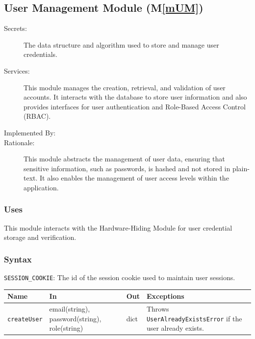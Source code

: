 \documentclass[12pt, titlepage]{article}
\newcommand{\mref}[1]{M\ref{#1}}
\begin{document}
\begin{description}
\begin{description}
\subsection{User Management Module (\mref{mUM})}
\begin{description}
  \item[Secrets:] The data structure and algorithm used to store and manage user
  credentials.
  \item[Services:]This module manages the creation, retrieval, and validation of
  user accounts. It interacts with the database to store user information and
  also provides interfaces for user authentication and Role-Based Access
  Control (RBAC).
  \item[Implemented By:] \progname{}
  \item[Rationale:] This module abstracts the management of user data, ensuring
  that sensitive information, such as passwords, is hashed and not stored in
  plain-text. It also enables the management of user access levels within the
  application. 
\end{description}

\subsubsection{Uses}
This module interacts with the Hardware-Hiding Module for user credential
storage and verification.

\subsubsection{Syntax}
\begin{description}
  \item[Exported Constants and Access Programs:]
  \item 
  \texttt{SESSION\_COOKIE}: The id of the session cookie used to maintain user sessions.
  
  \begin{table}[H]
    \centering
    \begin{tabular}{p{} p{} p{}
    p{}}
    \toprule
    \textbf{Name} & \textbf{In} & \textbf{Out} & \textbf{Exceptions}\\
    \midrule
    
    \texttt{createUser} & email(string), password(string), role(string) & dict &
    Throws \texttt{UserAlreadyExistsError} if the user already exists.\\
    \midrule
    

\end{tabular}
\end{table}
\end{description}
\end{description}
\end{description}
\end{document}
